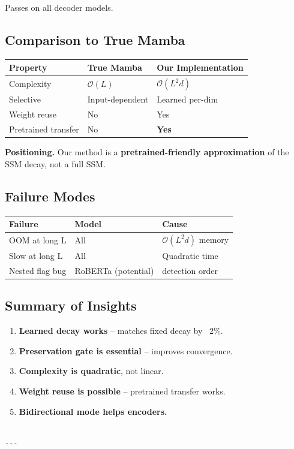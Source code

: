 Passes on all decoder models.

\subsection{Comparison to True Mamba}

\begin{table}[H]
\centering
\small
\begin{tabular}{lll}
\toprule
\textbf{Property} & \textbf{True Mamba} & \textbf{Our Implementation} \\
\midrule
Complexity & $\mathcal{O}(L)$ & $\mathcal{O}(L^2 d)$ \\
Selective & Input-dependent & Learned per-dim \\
Weight reuse & No & Yes \\
Pretrained transfer & No & \textbf{Yes} \\
\bottomrule
\end{tabular}
\end{table}

\textbf{Positioning.} Our method is a \textbf{pretrained-friendly approximation} of 
the SSM decay, not a full SSM.

\subsection{Failure Modes}

\begin{table}[H]
\centering
\small
\begin{tabular}{lll}
\toprule
\textbf{Failure} & \textbf{Model} & \textbf{Cause} \\
\midrule
OOM at long L & All & $\mathcal{O}(L^2 d)$ memory \\
Slow at long L & All & Quadratic time \\
Nested flag bug & RoBERTa (potential) & detection order \\
\bottomrule
\end{tabular}
\end{table}

\subsection{Summary of Insights}

\begin{enumerate}
\item \textbf{Learned decay works} -- matches fixed decay by ~2\%.
\item \textbf{Preservation gate is essential} -- improves convergence.
\item \textbf{Complexity is quadratic}, not linear.
\item \textbf{Weight reuse is possible} -- pretrained transfer works.
\item \textbf{Bidirectional mode helps encoders.}
\end{enumerate}
\begin{lstlisting}

---
\end{lstlisting}


